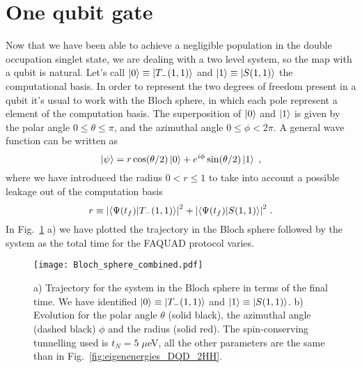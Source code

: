 \section{One qubit gate}
Now that we have been able to achieve a negligible population in the double occupation singlet state, we are dealing with a two level system, so the map with a qubit is natural. Let's call $\ket{0}\equiv\ket{T_-(1,1)}$ and $\ket{1}\equiv \ket{S(1,1)}$ the computational basis. In order to represent the two degrees of freedom present in a qubit it's usual to work with the Bloch sphere, in which each pole represent a element of the computation basis. The superposition of $\ket{0}$ and $\ket{1}$ is given by the polar angle $0\leq \theta\leq \pi$, and the azimuthal angle $0\leq\phi<2\pi$. A general wave function can be written as
\begin{equation}
	\ket{\psi}=r\cos(\theta/2)\ket{0}+e^{i\phi}\sin(\theta/2)\ket{1}\; ,
\end{equation}
where we have introduced the radius $0<r\leq 1$ to take into account a possible leakage out of the computation basis
\begin{equation}
	r\equiv \abs{\braket{\Psi(t_f)}{T_-(1,1)}}^2+\abs{\braket{\Psi(t_f)}{S(1,1)}}^2\; .
\end{equation}
In Fig.~\ref{fig:Bloch_sphere_combined} a) we have plotted the trajectory in the Bloch sphere followed by the system as the total time for the FAQUAD protocol varies.
\begin{figure}[!htb]
	\centering
	\texttt{[image: Bloch\_sphere\_combined.pdf]}
	\caption{a) Trajectory for the system in the Bloch sphere in terms of the final time. We have identified $\ket{0}\equiv\ket{T_-(1,1)}$ and $\ket{1}\equiv \ket{S(1,1)}$. b) Evolution for the polar angle $\theta$ (solid black), the azimuthal angle (dashed black) $\phi$ and the radius (solid red). The spin-conserving tunnelling used is $t_N=5\; \mu$eV, all the other parameters are the same than in Fig.~\ref{fig:eigenenergies_DQD_2HH}.}
	\label{fig:Bloch_sphere_combined}
\end{figure}

